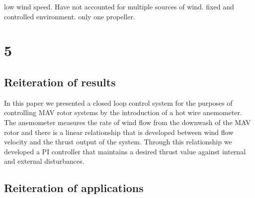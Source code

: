 \documentclass[conference]{IEEEtran}
\begin{document}
	low wind speed. Have not accounted for multiple sources of wind. fixed and controlled environment. only one propeller. 
	\section{5}
	\subsection{Reiteration of results}
	In this paper we presented a closed loop control system for the purposes of controlling MAV rotor systems by the introduction of a hot wire anemometer. The anemometer measures the rate of wind flow from the downwash of the MAV rotor and there is a linear relationship that is developed between wind flow velocity and the thrust output of the system. Through this relationship we developed a PI controller that maintains a desired thrust value against internal and external disturbances.
	\subsection{Reiteration of applications}
	
	\subsection{}
\end{document}
